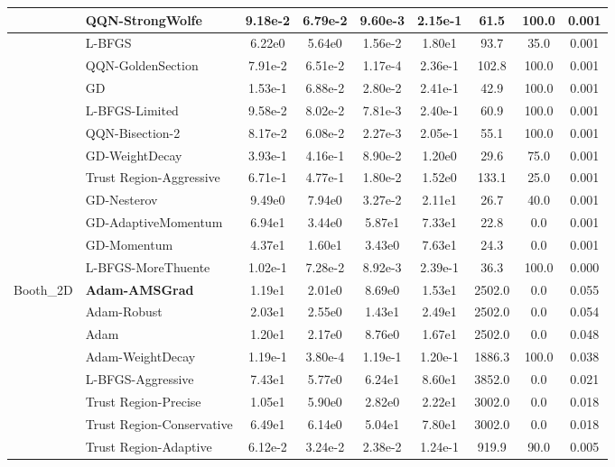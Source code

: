 \documentclass{article}
\begin{document}
\begin{longtable}{|l|l|c|c|c|c|c|c|c|}
\hline
 & QQN-StrongWolfe & 9.18e-2 & 6.79e-2 & 9.60e-3 & 2.15e-1 & 61.5 & 100.0 & 0.001 \\
\hline
 & L-BFGS & 6.22e0 & 5.64e0 & 1.56e-2 & 1.80e1 & 93.7 & 35.0 & 0.001 \\
\hline
 & QQN-GoldenSection & 7.91e-2 & 6.51e-2 & 1.17e-4 & 2.36e-1 & 102.8 & 100.0 & 0.001 \\
\hline
 & GD & 1.53e-1 & 6.88e-2 & 2.80e-2 & 2.41e-1 & 42.9 & 100.0 & 0.001 \\
\hline
 & L-BFGS-Limited & 9.58e-2 & 8.02e-2 & 7.81e-3 & 2.40e-1 & 60.9 & 100.0 & 0.001 \\
\hline
 & QQN-Bisection-2 & 8.17e-2 & 6.08e-2 & 2.27e-3 & 2.05e-1 & 55.1 & 100.0 & 0.001 \\
\hline
 & GD-WeightDecay & 3.93e-1 & 4.16e-1 & 8.90e-2 & 1.20e0 & 29.6 & 75.0 & 0.001 \\
\hline
 & Trust Region-Aggressive & 6.71e-1 & 4.77e-1 & 1.80e-2 & 1.52e0 & 133.1 & 25.0 & 0.001 \\
\hline
 & GD-Nesterov & 9.49e0 & 7.94e0 & 3.27e-2 & 2.11e1 & 26.7 & 40.0 & 0.001 \\
\hline
 & GD-AdaptiveMomentum & 6.94e1 & 3.44e0 & 5.87e1 & 7.33e1 & 22.8 & 0.0 & 0.001 \\
\hline
 & GD-Momentum & 4.37e1 & 1.60e1 & 3.43e0 & 7.63e1 & 24.3 & 0.0 & 0.001 \\
\hline
 & L-BFGS-MoreThuente & 1.02e-1 & 7.28e-2 & 8.92e-3 & 2.39e-1 & 36.3 & 100.0 & 0.000 \\
Booth\_2D & \textbf{Adam-AMSGrad} & 1.19e1 & 2.01e0 & 8.69e0 & 1.53e1 & 2502.0 & 0.0 & 0.055 \\
\hline
 & Adam-Robust & 2.03e1 & 2.55e0 & 1.43e1 & 2.49e1 & 2502.0 & 0.0 & 0.054 \\
\hline
 & Adam & 1.20e1 & 2.17e0 & 8.76e0 & 1.67e1 & 2502.0 & 0.0 & 0.048 \\
\hline
 & Adam-WeightDecay & 1.19e-1 & 3.80e-4 & 1.19e-1 & 1.20e-1 & 1886.3 & 100.0 & 0.038 \\
\hline
 & L-BFGS-Aggressive & 7.43e1 & 5.77e0 & 6.24e1 & 8.60e1 & 3852.0 & 0.0 & 0.021 \\
\hline
 & Trust Region-Precise & 1.05e1 & 5.90e0 & 2.82e0 & 2.22e1 & 3002.0 & 0.0 & 0.018 \\
\hline
 & Trust Region-Conservative & 6.49e1 & 6.14e0 & 5.04e1 & 7.80e1 & 3002.0 & 0.0 & 0.018 \\
\hline
 & Trust Region-Adaptive & 6.12e-2 & 3.24e-2 & 2.38e-2 & 1.24e-1 & 919.9 & 90.0 & 0.005 \\
\hline

\end{longtable}
\end{document}
